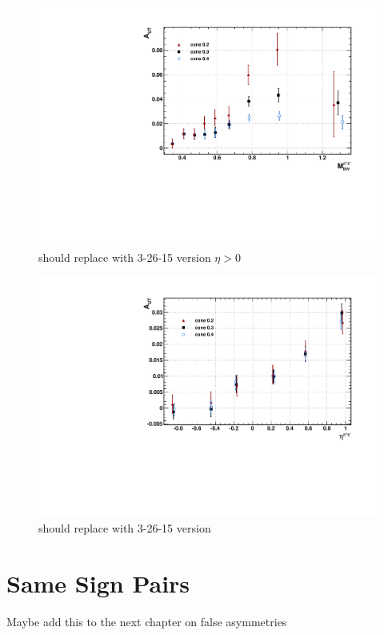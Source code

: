 \documentclass[abstract = on,listof=totoc, bibliography=totoc]{scrreprt}
\newcommand{\mpair}{M_{inv}^{\pi^+\pi^-}}
\newcommand{\etapair}{\eta^{\pi^+\pi^-}}
\begin{document}
\begin{figure}
\begin{center}
\includegraphics[width = .7\textwidth]{allConesMass}
\caption[Asymmetry vs $\mpair$ for different cone radii]{should replace with 3-26-15 version $\eta > 0$}
\label{fig:allConesMass}
\end{center}
\end{figure}

\begin{figure}
\begin{center}
\includegraphics[width = .7\textwidth]{allConesEta}
\caption[Asymmetry vs $\etapair$ for different cone radii]{should replace with 3-26-15 version}
\label{fig:allConesEta}
\end{center}
\end{figure}





\section{Same Sign Pairs}
Maybe add this to the next chapter on false asymmetries
\end{document}
